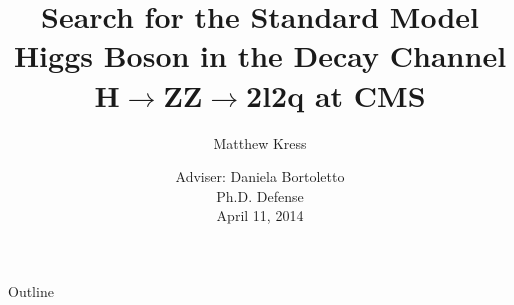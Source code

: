 \documentclass{beamer}
\title[H$\rightarrow$ZZ$\rightarrow$2l2q] %
{Search for the Standard Model Higgs Boson in the Decay Channel H$\rightarrow$ZZ$\rightarrow$2l2q at CMS}
\author[Matthew Kress] %
{Matthew Kress}
\institute[Purdue University] %
\date[April 11, 2014] %
{Adviser: Daniela Bortoletto
\\

Ph.D. Defense
\\
April 11, 2014
}
\begin{document}
\begin{frame}
  \titlepage
\end{frame}

\begin{frame}{Outline}
  \tableofcontents
\end{frame}




\end{document}
